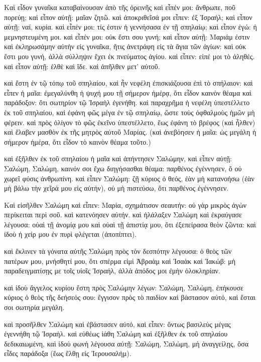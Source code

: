 \pend\pstart
{}

\pend\setcounter{pstartL}{1}\pstart
Καὶ εἶδον γυναῖκα καταβαίνουσαν ἀπὸ τῆς ὀρεινῆς καὶ εἶπέν μοι: ἄνθρωπε, ποῦ πορεύῃ; καὶ εἶπον αὐτῇ: μαῖαν ζητῶ. καὶ ἀποκριθεῖσά μοι εἶπεν: ἐξ Ἰσραήλ; καὶ εἶπον αὐτῇ: ναί, κυρία. καὶ εἶπέν μοι: τίς ἐστιν ἡ γεννήσασα ἐν τῇ σπηλαίῳ; καὶ εἶπον ἐγώ: ἡ μεμνηστευμένη μοι. καὶ εἶπέν μοι: οὐκ ἔστι σου γυνή; καὶ εἶπον αὐτῇ: Μαριάμ ἐστιν καὶ ἐκληρωσάμην αὐτὴν εἰς γυναῖκα, ἥτις ἀνετράφη εἰς τὰ ἅγια τῶν ἁγίων: καὶ οὐκ ἔστι μου γυνή, ἀλλὰ σύλληψιν ἔχει ἐκ πνεύματος ἁγίου. καὶ εἶπεν: εἰπέ μοι τὸ ἀληθές. καὶ εἶπον αὐτῇ: ἐλθὲ καὶ ἴδε. καὶ ἀπῆλθεν μετ' αὐτοῦ.

\pend\pstart
καὶ ἔστη ἐν τῷ τόπῳ τοῦ σπηλαίου, καὶ ἦν νεφέλη ἐπισκιάζουσα ἐπὶ τὸ σπήλαιον: καὶ εἶπεν ἡ μαῖα: ἐμεγαλύνθη ἡ ψυχή μου τῇ σήμερον ἡμέρᾳ, ὅτι εἶδον καινὸν θέαμα καὶ παράδοξον: ὅτι σωτηρίον τῷ Ἰσραὴλ ἐγενήθη. καὶ παραχρῆμα ἡ νεφέλη ὑπεστέλλετο ἐκ τοῦ σπηλαίου, καὶ ἐφάνη φῶς μέγα ἐν τῷ σπηλαίῳ, ὥστε τοὺς ὀφθαλμοὺς ἡμῶν μὴ φέρειν. καὶ πρὸς ὀλίγον τὸ φῶς ἐκεῖνο ὑπεστέλλετο, ἕως ἐφάνη τὸ βρέφος (καὶ ἦλθεν) καὶ ἔλαβεν μασθὸν ἐκ τῆς μητρὸς αὐτοῦ Μαρίας. (καὶ ἀνεβόησεν ἡ μαῖα: ὡς μεγάλη ἡ σήμερον ἡμέρα, ὅτι εἶδον τὸ καινὸν θέαμα τοῦτο.)

\pend\pstart
καὶ ἐξῆλθεν ἐκ τοῦ σπηλαίου ἡ μαῖα καὶ ἀπήντησεν Σαλώμην, καὶ εἶπεν αὐτῇ: Σαλώμη, Σαλώμη, καινόν σοι ἔχω διηγήσασθαι θέαμα: παρθένος ἐγέννησεν, ὅ οὐ χωρεῖ φύσις ἀνθρωπίνη. καὶ εἶπεν Σαλώμη: ζῇ κύριος ὁ θεός, ἐὰν μὴ κατανοήσω (ἐὰν μὴ βάλω τὴν χεῖρά μου εἰς αὐτήν), οὐ μὴ πιστεύσω, ὅτι παρθένος ἐγέννησεν.

\pend\pstart
{}

\pend\setcounter{pstartL}{1}\pstart
Καὶ εἰσῆλθεν Σαλώμη καὶ εἶπεν: Μαρία, σχημάτισον σεαυτήν: οὐ γὰρ μικρὸς ἀγὼν περίκειται περὶ σοῦ. καὶ κατενόησεν αὐτήν. καὶ ἠλάλαξεν Σαλώμη καὶ ἐκραύγασε λέγουσα: οὐαὶ τῇ ἀνομίᾳ μου καὶ οὐαὶ τῇ ἀπιστίᾳ μου, ὅτι ἐξεπείρασα θεὸν ζῶντα: καὶ ἰδοὺ ἡ χείρ μου ἐν πυρὶ φλέγεται (ἀποπίπτει).

\pend\pstart
καὶ ἔκλινεν τὰ γόνατα αὐτῆς Σαλώμη πρὸς τὸν δεσπότην λέγουσα: ὁ θεὸς τῶν πατέρων μου, μνήσθητί μου, ὅτι σπέρμα εἰμὶ Ἀβραὰμ καὶ Ἰσαὰκ καὶ Ἰακώβ: μὴ παραδειγματίσῃς με τοῖς υἱοῖς Ἰσραήλ, ἀλλὰ ἀπόδος μοι ἐμὴν ὁλοκληρίαν.

\pend\pstart
καὶ ἰδοὺ ἄγγελος κυρίου ἔστη πρὸς Σαλώμην λέγων: Σαλώμη, Σαλώμη, ἐπήκουσε κύριος ὁ θεὸς τῆς δεήσεός σου: ἔγγισον πρὸς τὸ παιδίον καὶ βάστασον αὐτό, καὶ ἔσται σοι σωτηρία μεγάλη.

\pend\pstart
καὶ προσῆλθεν Σαλώμη καὶ ἐβάστασεν αὐτό, καὶ εἶπεν: ὄντως βασιλεὺς μέγας ἐγεννήθη τῷ Ἰσραήλ. καὶ εὐθέως ἰάθη Σαλώμη καὶ ἐξῆλθεν ἐκ τοῦ σπηλαίου δεδικαιωμένη, καὶ ἰδοὺ φωνὴ λέγουσα αὐτῇ: Σαλώμη, Σαλώμη, μὴ ἀναγγείλῃς, ὅσα εἶδες παράδοξα (ἕως ἔλθῃ εἰς Ἰερουσαλήμ).

